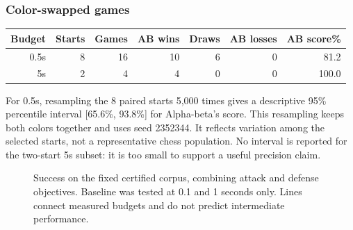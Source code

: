 \subsubsection*{Color-swapped games}
\begin{center}\small\begin{tabular}{rrrrrrr}\toprule
Budget & Starts & Games & AB wins & Draws & AB losses & AB score\%\\\midrule
0.5s & 8 & 16 & 10 & 6 & 0 & 81.2 \\
5s & 2 & 4 & 4 & 0 & 0 & 100.0 \\
\bottomrule\end{tabular}\end{center}
For 0.5s, resampling the 8 paired starts 5,000 times gives a descriptive 95\% percentile interval [65.6\%, 93.8\%] for Alpha-beta's score.
This resampling keeps both colors together and uses seed 2352344. It reflects
variation among the selected starts, not a representative chess population.
No interval is reported for the two-start 5s subset: it is too small to support a useful precision claim.
\begin{figure}[ht]\centering
{}
\caption{Success on the fixed certified corpus, combining attack and defense objectives. Baseline was tested at 0.1 and 1 seconds only. Lines connect measured budgets and do not predict intermediate performance.}\end{figure}
